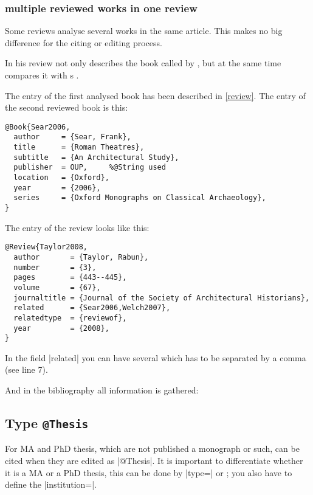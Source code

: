 \documentclass[a4paper,
10pt,
greek,
french,
spanish,
italian,
ngerman,
english
]{ltxdoc}
\begin{document}


\subsubsection{multiple reviewed works in one review}
Some reviews analyse several works in the same article. 
This makes no big difference for the citing or editing process.

In his review
\citeauthor{Taylor2008} not only describes the book called
  by \citeauthor{Welch2007}, 
 but at the same time compares it with \citeauthor{Sear2006}s .

The entry of the first analysed book  has been described in \cref{review}.
The entry of the second reviewed book is this:
\begin{lstlisting}[style=bibentry,label=Sear2006,caption={{@}Book\{Sear2006,…\} }]
@Book{Sear2006,
  author     = {Sear, Frank},
  title      = {Roman Theatres},
  subtitle   = {An Architectural Study},
  publisher  = OUP,		%@String used
  location   = {Oxford},
  year       = {2006},
  series     = {Oxford Monographs on Classical Archaeology},
}
\end{lstlisting}

The entry of the review looks like this:
\begin{lstlisting}[style=bibentry,label=Taylor2008,caption={{@}Review\{Taylor2008,…\} }]
@Review{Taylor2008,
  author       = {Taylor, Rabun},
  number       = {3},
  pages        = {443--445},
  volume       = {67},
  journaltitle = {Journal of the Society of Architectural Historians},
  related      = {Sear2006,Welch2007},
  relatedtype  = {reviewof},
  year         = {2008},
}
\end{lstlisting}
In the field |related| you can have several  which has to be separated by a comma (see line 7).

And in the bibliography all information is gathered:



 \subsection{Type \texttt{@Thesis}}\label{thesis}
For MA and PhD thesis, which are not published a monograph or such, can be cited when they are edited as |@Thesis|.
It is important to differentiate whether it is a MA or a PhD thesis,
this can be done by |type=| or
 ; you also have to define the  |institution=|.
 
\end{document}
